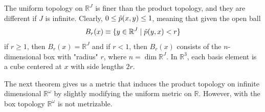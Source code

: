 \documentclass{article}
\begin{document}
    The uniform topology on $\mathbb{R}^J$ is finer than the product topology, and they are different if $J$ is infinite. Clearly, $0 \leq \Tilde{p} (x, y) \leq 1$, meaning that given the open ball
    \[B_r (x) \equiv \{y \in \mathbb{R}^J \;|\; \Tilde{p}(y, x) < r\}\]
    if $r \geq 1$, then $B_r (x) = \mathbb{R}^J$ and if $r<1$, then $B_r (x)$ consists of the $n$-dimensional box with "radius" $r$, where $n = \dim{\mathbb{R}^J}$. In $\mathbb{R}^3$, each basis element is a cube centered at $x$ with side lengths $2r$.
    \begin{center}
    \end{center}

    The next theorem gives us a metric that induces the product topology on infinite dimensional $\mathbb{R}^\omega$ by slightly modifying the uniform metric on $\mathbb{R}$. However, with the box topology $\mathbb{R}^\omega$ is not metrizable. 
\end{document}
